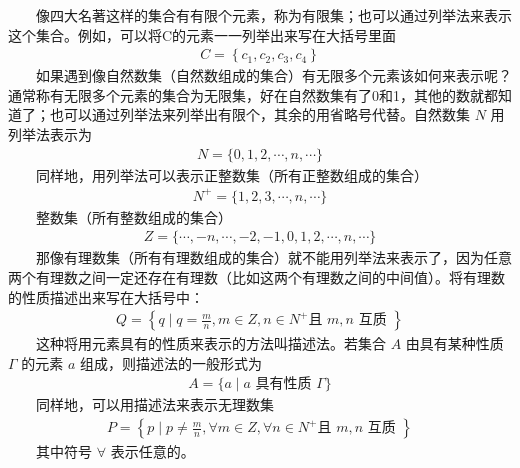 \documentclass[a4paper,11pt,english]{sphinxmanual}
\begin{document}
\sphinxAtStartPar
  像四大名著这样的集合有有限个元素，称为有限集；也可以通过列举法来表示这个集合。例如，可以将C的元素一一列举出来写在大括号里面
\begin{equation*}
\begin{split}C=\left\{c_{1}, c_{2}, c_{3}, c_{4}\right\}\end{split}
\end{equation*}
\sphinxAtStartPar
  如果遇到像自然数集（自然数组成的集合）有无限多个元素该如何来表示呢？通常称有无限多个元素的集合为无限集，好在自然数集有了0和1，其他的数就都知道了；也可以通过列举法来列举出有限个，其余的用省略号代替。自然数集 \(N\) 用列举法表示为
\begin{equation*}
\begin{split}N=\{0,1,2, \cdots, n, \cdots\}\end{split}
\end{equation*}
\sphinxAtStartPar
  同样地，用列举法可以表示正整数集（所有正整数组成的集合）
\begin{equation*}
\begin{split}N^{+}=\{1,2,3, \cdots, n, \cdots\}\end{split}
\end{equation*}
\sphinxAtStartPar
  整数集（所有整数组成的集合）
\begin{equation*}
\begin{split}Z=\{\cdots,-n, \cdots, -2,-1,0,1,2, \cdots, n, \cdots\}\end{split}
\end{equation*}
\sphinxAtStartPar
  那像有理数集（所有有理数组成的集合）就不能用列举法来表示了，因为任意两个有理数之间一定还存在有理数（比如这两个有理数之间的中间值）。将有理数的性质描述出来写在大括号中：
\begin{equation*}
\begin{split}Q=\left\{q \mid q=\frac{m}{n}, m \in Z, n \in N^{+} \text {且 } m, n \text { 互质 }\right\}\end{split}
\end{equation*}
\sphinxAtStartPar
  这种将用元素具有的性质来表示的方法叫描述法。若集合 \(A\) 由具有某种性质 \(\Gamma\) 的元素 \(a\) 组成，则描述法的一般形式为
\begin{equation*}
\begin{split}A=\{a \mid a \text { 具有性质 } \Gamma\}\end{split}
\end{equation*}
\sphinxAtStartPar
  同样地，可以用描述法来表示无理数集
\begin{equation*}
\begin{split}P=\left\{p \mid p \neq \frac{m}{n}, \forall m \in Z, \forall n \in N^{+} \text {且 } m, n \text { 互质 }\right\}\end{split}
\end{equation*}
\sphinxAtStartPar
  其中符号 \(\forall\) 表示任意的。
\end{document}
